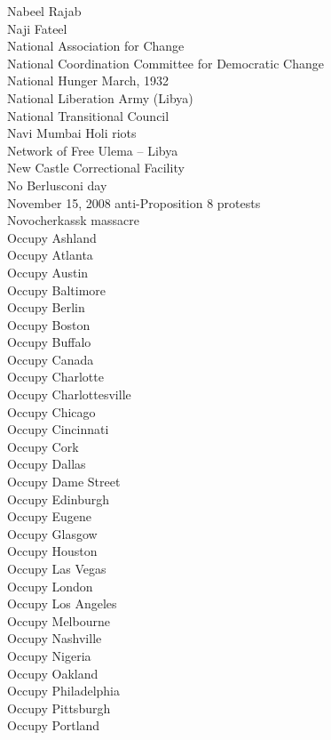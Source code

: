 Nabeel Rajab\\
Naji Fateel\\
National Association for Change\\
National Coordination Committee for Democratic Change\\
National Hunger March, 1932\\
National Liberation Army (Libya)\\
National Transitional Council\\
Navi Mumbai Holi riots\\
Network of Free Ulema – Libya\\
New Castle Correctional Facility\\
No Berlusconi day\\
November 15, 2008 anti-Proposition 8 protests\\
Novocherkassk massacre\\
Occupy Ashland\\
Occupy Atlanta\\
Occupy Austin\\
Occupy Baltimore\\
Occupy Berlin\\
Occupy Boston\\
Occupy Buffalo\\
Occupy Canada\\
Occupy Charlotte\\
Occupy Charlottesville\\
Occupy Chicago\\
Occupy Cincinnati\\
Occupy Cork\\
Occupy Dallas\\
Occupy Dame Street\\
Occupy Edinburgh\\
Occupy Eugene\\
Occupy Glasgow\\
Occupy Houston\\
Occupy Las Vegas\\
Occupy London\\
Occupy Los Angeles\\
Occupy Melbourne\\
Occupy Nashville\\
Occupy Nigeria\\
Occupy Oakland\\
Occupy Philadelphia\\
Occupy Pittsburgh\\
Occupy Portland\\

